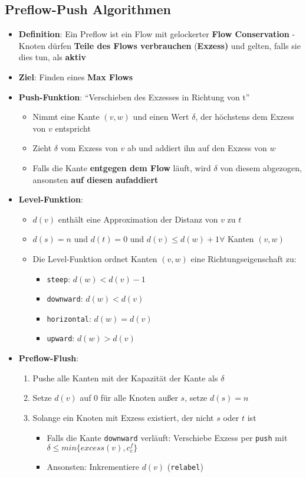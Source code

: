 \documentclass[10pt,a4paper]{article}
\newcommand{\quotestyle}[1]{\enquote{#1}}
\begin{document}
	\newpage
	\subsection{Preflow-Push Algorithmen}
	\label{mfm:sub:preflow_push_algorithmen}
	
	\begin{itemize}
		\item \textbf{Definition}: Ein Preflow ist ein Flow mit gelockerter \textbf{Flow Conservation} - Knoten dürfen \textbf{Teile des Flows verbrauchen} (\textbf{Exzess)} und gelten, falls sie dies tun, als \textbf{aktiv}
		\item \textbf{Ziel}: Finden eines \textbf{Max Flows}
		\item \textbf{Push-Funktion}: \quotestyle{Verschieben des Exzesses in Richtung von t}
		\begin{itemize}
			\item Nimmt eine Kante $(v,w)$ und einen Wert $\delta$, der höchstens dem Exzess von $v$ entspricht
			\item Zieht $\delta$ vom Exzess von $v$ ab und addiert ihn auf den Exzess von $w$
			\item Falls die Kante \textbf{entgegen dem Flow} läuft, wird $\delta$ von diesem abgezogen, ansonsten \textbf{auf diesen aufaddiert}
		\end{itemize}
		\item \textbf{Level-Funktion}:
		\begin{itemize}
			\item $d(v)$ enthält eine Approximation der Distanz von $v$ zu $t$
			\item $d(s) = n$ und $d(t) = 0$ und $d(v) \leq d(w) + 1 \forall$ Kanten $(v,w)$
			\item Die Level-Funktion ordnet Kanten $(v,w)$ eine Richtungseigenschaft zu:
			\begin{itemize}
				\item \texttt{steep}: $d(w) < d(v) - 1$
				\item \texttt{downward}: $d(w) < d(v)$
				\item \texttt{horizontal}: $d(w) = d(v)$
				\item \texttt{upward}: $d(w) > d(v)$
			\end{itemize}
		\end{itemize}
		\item \textbf{Preflow-Flush}:
		\begin{enumerate}
			\item Pushe alle Kanten mit der Kapazität der Kante als $\delta$
			\item Setze $d(v)$ auf $0$ für alle Knoten außer $s$, setze $d(s) = n$
			\item Solange ein Knoten mit Exzess existiert, der nicht $s$ oder $t$ ist
			\begin{itemize}
				\item Falls die Kante \texttt{downward} verläuft: Verschiebe Exzess per \texttt{push} mit $\delta \leq min\{excess(v), c_e^f\}$
				\item Ansonsten: Inkrementiere $d(v)$ (\texttt{relabel})
			\end{itemize}
		\end{enumerate}
	\end{itemize}
\end{document}
